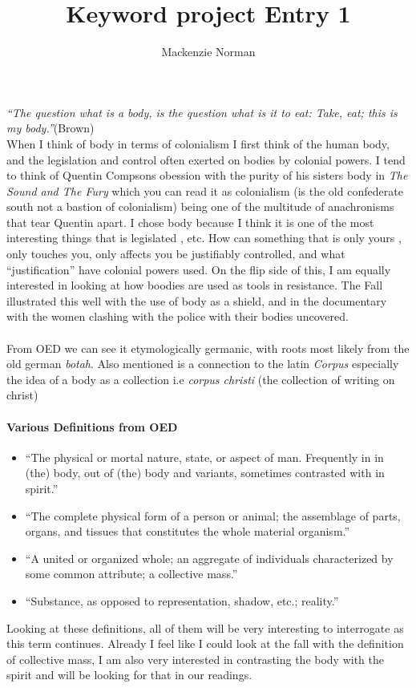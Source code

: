 \documentclass{article}
\title{Keyword project Entry 1}
\author{Mackenzie Norman}
\date{}
\begin{document}
\maketitle
\textit{``The question what is a body, is the question what is it to eat: Take, eat; this is my body.''}(Brown) \\


When I think of body in terms of colonialism I first think of the human body, and the legislation and control often exerted on bodies by colonial powers. I tend to think of Quentin Compsons obession with the purity of his sisters body in \textit{The Sound and The Fury} which you can read it as colonialism (is the old confederate south not a bastion of colonialism) being one of the multitude of anachronisms that tear Quentin apart. I chose body because I think it is one of the most interesting things that is legislated , etc. How can something that is only yours , only touches you, only affects you be justifiably controlled, and what ``justification'' have colonial powers used. 
On the flip side of this, I am equally interested in looking at how boodies are used as tools in resistance. The Fall illustrated this well with the use of body as a shield, and in the documentary with the women clashing with the police with their bodies uncovered.

\paragraph{}
From OED we can see it etymologically germanic, with roots most likely from the old german \textit{botah}. Also mentioned is a connection to the latin \textit{Corpus} especially the idea of a body as a collection i.e \textit{corpus christi} (the collection of writing on christ)
\paragraph{Various Definitions from OED}
\begin{itemize}
\item ``The physical or mortal nature, state, or aspect of man. Frequently in in (the) body, out of (the) body and variants, sometimes contrasted with in spirit.''

\item``The complete physical form of a person or animal; the assemblage of parts, organs, and tissues that constitutes the whole material organism.''

\item``A united or organized whole; an aggregate of individuals characterized by some common attribute; a collective mass.''

\item``Substance, as opposed to representation, shadow, etc.; reality.''

\end{itemize}
Looking at these definitions, all of them will be very interesting to interrogate as this term continues. Already I feel like I could look at the fall with the definition of collective mass, I am also very interested in contrasting the body with the spirit and will be looking for that in our readings.\\
\end{document}
